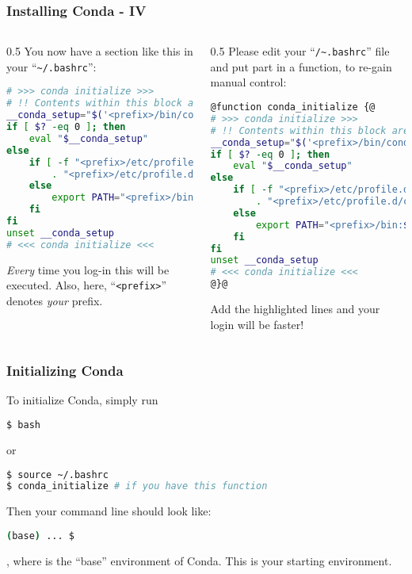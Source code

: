 \begin{frame}[fragile]
  \frametitle{Installing Conda - IV}
  \footnotesize
  \begin{columns}[t]
    \begin{column}{0.5\textwidth}
       You now have a section like this in your ``\texttt{\textasciitilde/.bashrc}'':
       \begin{lstlisting}[language=Bash, style=Shell, basicstyle=\tiny, breaklines=true]
# >>> conda initialize >>>
# !! Contents within this block are managed by 'conda init' !!
__conda_setup="$('<prefix>/bin/conda' 'shell.bash' 'hook' 2> /dev/null)"
if [ $? -eq 0 ]; then
    eval "$__conda_setup"
else
    if [ -f "<prefix>/etc/profile.d/conda.sh" ]; then
        . "<prefix>/etc/profile.d/conda.sh"
    else
        export PATH="<prefix>/bin:$PATH"
    fi
fi
unset __conda_setup
# <<< conda initialize <<<
      \end{lstlisting}
      \bcattention \emph{Every} time you log-in this will be executed. Also, here, ``\texttt{<prefix>}'' denotes \emph{your} prefix.
    \end{column}
    \begin{column}{0.5\textwidth}
       \pause
       Please edit your ``\texttt{/\textasciitilde.bashrc}'' file and put part in a function, to re-gain manual control:
       \begin{lstlisting}[language=Bash, style=Shell, basicstyle=\tiny, breaklines=true]
@function conda_initialize {@
# >>> conda initialize >>>
# !! Contents within this block are managed by 'conda init' !!
__conda_setup="$('<prefix>/bin/conda' 'shell.bash' 'hook' 2> /dev/null)"
if [ $? -eq 0 ]; then
    eval "$__conda_setup"
else
    if [ -f "<prefix>/etc/profile.d/conda.sh" ]; then
        . "<prefix>/etc/profile.d/conda.sh"
    else
        export PATH="<prefix>/bin:$PATH"
    fi
fi
unset __conda_setup
# <<< conda initialize <<<
@}@
      \end{lstlisting}
      \bcattention Add the highlighted lines and your login will be faster!
    \end{column}
  \end{columns}
\end{frame}

\begin{frame}[fragile]
  \frametitle{Initializing Conda}
  To initialize Conda, simply run
  \begin{lstlisting}[language=Bash, style=Shell]
$ bash
  \end{lstlisting}
  or
  \begin{lstlisting}[language=Bash, style=Shell]
$ source ~/.bashrc
$ conda_initialize # if you have this function
  \end{lstlisting}
  Then your command line should look like:
  \begin{lstlisting}[language=Bash, style=Shell]
(base) ... $
  \end{lstlisting}
  , where  is the ``base'' environment of Conda. This is your starting environment.
\end{frame}

